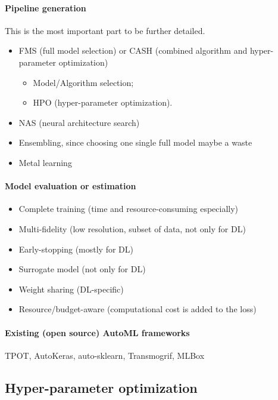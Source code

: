 \paragraph{Pipeline generation} 
This is the most important part to be further detailed.

\begin{itemize}
    \item FMS (full model selection) or CASH (combined algorithm and hyper-parameter optimization)
    \begin{itemize}
        \item Model/Algorithm selection;
        \item HPO (hyper-parameter optimization).
    \end{itemize}
    \item NAS (neural architecture search)
    \item Ensembling, since choosing one single full model maybe a waste
    \item Metal learning
\end{itemize}

\paragraph{Model evaluation or estimation}

\begin{itemize}
    \item Complete training (time and resource-consuming especially)
    \item Multi-fidelity (low resolution, subset of data, not only for DL)
    \item Early-stopping (mostly for DL)
    \item Surrogate model (not only for DL)
    \item Weight sharing (DL-specific)
    \item Resource/budget-aware (computational cost is added to the loss)
\end{itemize}
    
    
\paragraph{Existing (open source) AutoML frameworks} 
TPOT, AutoKeras, auto-sklearn, Transmogrif, MLBox

\subsection{Hyper-parameter optimization}\label{sec:dttts.survey.hpo}

